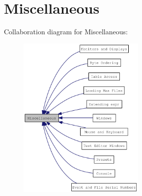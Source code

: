 \hypertarget{group__misc}{
\section{Miscellaneous}
\label{group__misc}
}


Collaboration diagram for Miscellaneous:\nopagebreak
\begin{figure}[H]
\begin{center}
\leavevmode
\includegraphics[width=175pt]{group__misc}
\end{center}
\end{figure}
